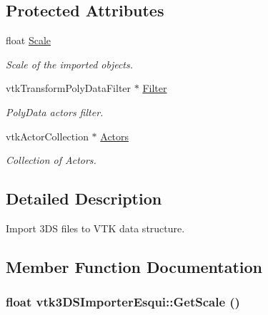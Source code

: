 \subsection*{Protected Attributes}
\begin{DoxyCompactItemize}
\item 
\hypertarget{classvtk3DSImporterEsqui_a28c9b1391efd85ac869c7228361ce8c7}{
float \hyperlink{classvtk3DSImporterEsqui_a28c9b1391efd85ac869c7228361ce8c7}{Scale}}
\label{classvtk3DSImporterEsqui_a28c9b1391efd85ac869c7228361ce8c7}

\begin{DoxyCompactList}\small\item\em Scale of the imported objects. \item\end{DoxyCompactList}\item 
\hypertarget{classvtk3DSImporterEsqui_a2f3f01dce9d8c2d512f7f1f291ffa2b0}{
vtkTransformPolyDataFilter $\ast$ \hyperlink{classvtk3DSImporterEsqui_a2f3f01dce9d8c2d512f7f1f291ffa2b0}{Filter}}
\label{classvtk3DSImporterEsqui_a2f3f01dce9d8c2d512f7f1f291ffa2b0}

\begin{DoxyCompactList}\small\item\em PolyData actors filter. \item\end{DoxyCompactList}\item 
\hypertarget{classvtk3DSImporterEsqui_afecb7ce1a23ab054c6d681670781cfec}{
vtkActorCollection $\ast$ \hyperlink{classvtk3DSImporterEsqui_afecb7ce1a23ab054c6d681670781cfec}{Actors}}
\label{classvtk3DSImporterEsqui_afecb7ce1a23ab054c6d681670781cfec}

\begin{DoxyCompactList}\small\item\em Collection of Actors. \item\end{DoxyCompactList}\end{DoxyCompactItemize}


\subsection{Detailed Description}
Import 3DS files to VTK data structure. 

\subsection{Member Function Documentation}
\hypertarget{classvtk3DSImporterEsqui_a3951ad4b8163e28825f7f9afdfcfa46c}{
\subsubsection[{GetScale}]{\setlength{\rightskip}{0pt plus 5cm}float vtk3DSImporterEsqui::GetScale ()}}
\label{classvtk3DSImporterEsqui_a3951ad4b8163e28825f7f9afdfcfa46c}


